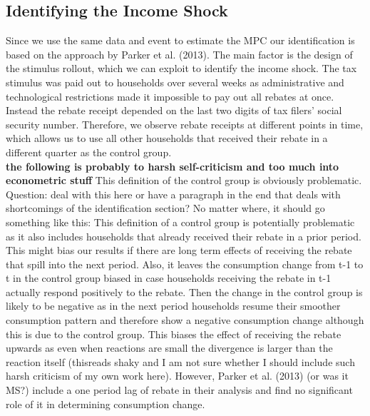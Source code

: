 \subsection{Identifying the Income Shock}
Since we use the same data and event to estimate the MPC our identification is based on the approach by Parker et al. (2013). The main factor is the design of the stimulus rollout, which we can exploit to identify the income shock. The tax stimulus was paid out to households over several weeks as administrative and technological restrictions made it impossible to pay out all rebates at once. Instead the rebate receipt depended on the last two digits of tax filers' social security number. Therefore, we observe rebate receipts at different points in time, which allows us to use all other households that received their rebate in a different quarter as the control group. \\
\textbf{the following is probably to harsh self-criticism and too much into econometric stuff}
This definition of the control group is obviously problematic. Question: deal with this here or have a paragraph in the end that deals with shortcomings of the identification section? No matter where, it should go something like this: 
This definition of a control group is potentially problematic as it also includes households that already received their rebate in a prior period. This might bias our results if there are long term effects of receiving the rebate that spill into the next period. Also, it leaves the consumption change from t-1 to t in the control group biased in case households receiving the rebate in t-1  actually respond positively to the rebate. Then the change in the control group is likely to be negative as in the next period households resume their smoother consumption pattern and therefore show a negative consumption change although this is due to the control group. This biases the effect of receiving the rebate upwards as even when reactions are small the divergence is larger than the reaction itself (thisreads shaky and I am not sure whether I should include such harsh criticism of my own work here).
However, Parker et al. (2013) (or was it MS?) include a one period lag of rebate in their analysis and find no significant role of it in determining consumption change. 
\\
